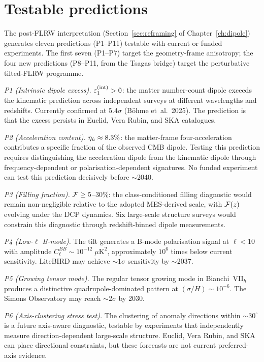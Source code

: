\section{Testable predictions}\label{sec:seven-predictions}

The post-FLRW interpretation
(Section~\ref{sec:reframing} of Chapter~\ref{ch:dipole})
generates eleven predictions (P1--P11) testable with current
or funded experiments.  The first seven (P1--P7) target the
geometry-frame anisotropy; the four new predictions
(P8--P11, from the Tsagas bridge) target the perturbative
tilted-FLRW programme.

\emph{P1 (Intrinsic dipole excess).}
$\varepsilon_1^{(\mathrm{int})} > 0$: the matter number-count dipole
exceeds the kinematic prediction across independent surveys at
different wavelengths and redshifts.  Currently confirmed at
$5.4\sigma$ (B\"ohme et~al.~2025).  The prediction is that the
excess persists in Euclid, Vera Rubin, and SKA catalogues.

\emph{P2 (Acceleration content).}
$\eta_{\dot{u}} \approx 8.3\%$: the matter-frame four-acceleration
contributes a specific fraction of the observed CMB dipole.
Testing this prediction requires distinguishing the
acceleration dipole from the kinematic dipole through
frequency-dependent or polarisation-dependent signatures.
No funded experiment can test this prediction decisively before
$\sim$2040.

\emph{P3 (Filling fraction).}
$\mathcal{F} \geq 5$--$30\%$: the class-conditioned filling diagnostic
would remain non-negligible relative to the adopted MES-derived
scale, with $\mathcal{F}(z)$ evolving under the DCP dynamics.  Six
large-scale structure surveys would constrain this diagnostic
through redshift-binned dipole measurements.

\emph{P4 (Low-$\ell$ B-mode).}
The tilt generates a B-mode polarisation signal at $\ell < 10$
with amplitude $C_\ell^{BB} \sim 10^{-12}\;\mu\mathrm{K}^2$,
approximately $10^6$ times below current sensitivity.  LiteBIRD
may achieve $\sim 1\sigma$ sensitivity by $\sim$2037.

\emph{P5 (Growing tensor mode).}
The regular tensor growing mode in Bianchi~VII$_h$ produces a
distinctive quadrupole-dominated pattern at
$(\sigma/H) \sim 10^{-6}$.  The Simons Observatory may reach
$\sim 2\sigma$ by 2030.

\emph{P6 (Axis-clustering stress test).}
The clustering of anomaly directions within $\sim 30^\circ$ is
a future axis-aware diagnostic, testable by experiments that
independently measure direction-dependent large-scale structure.
Euclid, Vera Rubin, and SKA can place directional constraints,
but these forecasts are not current preferred-axis evidence.


